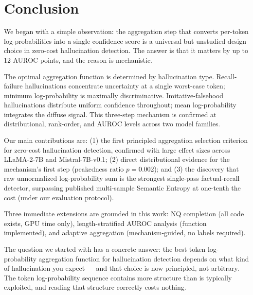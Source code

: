 \section{Conclusion}

We began with a simple observation: the aggregation step that converts per-token log-probabilities into a single confidence score is a universal but unstudied design choice in zero-cost hallucination detection. The answer is that it matters by up to 12 AUROC points, and the reason is mechanistic.

The optimal aggregation function is determined by hallucination type. Recall-failure hallucinations concentrate uncertainty at a single worst-case token; minimum log-probability is maximally discriminative. Imitative-falsehood hallucinations distribute uniform confidence throughout; mean log-probability integrates the diffuse signal. This three-step mechanism is confirmed at distributional, rank-order, and AUROC levels across two model families.

Our main contributions are: (1) the first principled aggregation selection criterion for zero-cost hallucination detection, confirmed with large effect sizes across LLaMA-2-7B and Mistral-7B-v0.1; (2) direct distributional evidence for the mechanism's first step (peakedness ratio $p = 0.002$); and (3) the discovery that raw unnormalized log-probability sum is the strongest single-pass factual-recall detector, surpassing published multi-sample Semantic Entropy at one-tenth the cost (under our evaluation protocol).

Three immediate extensions are grounded in this work: NQ completion (all code exists, GPU time only), length-stratified AUROC analysis (function implemented), and adaptive aggregation (mechanism-guided, no labels required).

The question we started with has a concrete answer: the best token log-probability aggregation function for hallucination detection depends on what kind of hallucination you expect --- and that choice is now principled, not arbitrary. The token log-probability sequence contains more structure than is typically exploited, and reading that structure correctly costs nothing.
